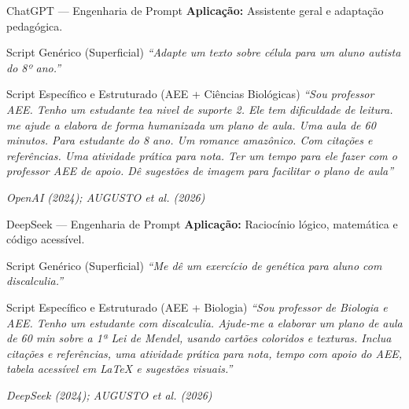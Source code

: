 \documentclass[11pt]{beamer}
\newcommand{\citabnt}[1]{%
	\vfill
	\begin{flushright}
		\tiny\textit{#1}
	\end{flushright}
}
\begin{document}
	\begin{frame}{ChatGPT — Engenharia de Prompt}
		\textbf{Aplicação:} Assistente geral e adaptação pedagógica.
		
		\vspace{0.4em}
		\begin{block}{Script Genérico (Superficial)}
			\small
			\textit{``Adapte um texto sobre célula para um aluno autista do 8º ano.''}
		\end{block}
		
		\vspace{0.3em}
		\begin{block}{Script Específico e Estruturado (AEE + Ciências Biológicas)}
			\justifying
			\small
			\textit{``Sou professor AEE. Tenho um estudante tea nivel de suporte 2. Ele tem dificuldade de leitura. me ajude a elabora de forma humanizada um plano de aula. Uma aula de 60 minutos. Para estudante do 8 ano. Um romance amazônico. Com citações e referências. Uma atividade prática para nota. Ter um tempo para ele fazer com o professor AEE de apoio. Dê sugestões de imagem para facilitar o plano de aula''}
		\end{block}
		\citabnt{OpenAI (2024); AUGUSTO et al. (2026)}
	\end{frame}
	
	\begin{frame}{DeepSeek — Engenharia de Prompt}
		\textbf{Aplicação:} Raciocínio lógico, matemática e código acessível.
		
		\vspace{0.4em}
		\begin{block}{Script Genérico (Superficial)}
			\small
			\textit{``Me dê um exercício de genética para aluno com discalculia.''}
		\end{block}
		
		\vspace{0.3em}
		\begin{block}{Script Específico e Estruturado (AEE + Biologia)}
			\justifying
			\small
			\textit{``Sou professor de Biologia e AEE. Tenho um estudante com discalculia. Ajude-me a elaborar um plano de aula de 60 min sobre a 1ª Lei de Mendel, usando cartões coloridos e texturas. Inclua citações e referências, uma atividade prática para nota, tempo com apoio do AEE, tabela acessível em LaTeX e sugestões visuais.''}
		\end{block}
		\citabnt{DeepSeek (2024); AUGUSTO et al. (2026)}
	\end{frame}
	
\end{document}
